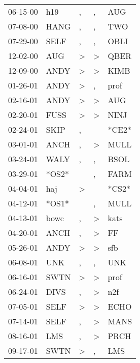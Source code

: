 \begin{supertabular}{lllll}
 06-15-00 &    h19 &             , &                , &    AUG \\
 07-08-00 &   HANG &             , &                , &    TWO \\
 07-29-00 &   SELF &             , &                , &   OBLI \\
 12-02-00 &    AUG &  \textgreater &     \textgreater &   QBER \\
 12-09-00 &   ANDY &  \textgreater &     \textgreater &   KIMB \\
 01-26-01 &   ANDY &  \textgreater &                , &   prof \\
 02-16-01 &   ANDY &  \textgreater &     \textgreater &    AUG \\
 02-20-01 &   FUSS &  \textgreater &     \textgreater &   NINJ \\
 02-24-01 &   SKIP &             , &                  &  *CE2* \\
 03-01-01 &   ANCH &             , &     \textgreater &   MULL \\
 03-24-01 &   WALY &             , &                , &   BSOL \\
 03-29-01 &  *OS2* &               &                , &   FARM \\
 04-04-01 &    haj &  \textgreater &                  &  *CS2* \\
 04-12-01 &  *OS1* &               &                , &   MULL \\
 04-13-01 &   bowc &             , &     \textgreater &   kats \\
 04-20-01 &   ANCH &             , &     \textgreater &     FF \\
 05-26-01 &   ANDY &  \textgreater &     \textgreater &    sfb \\
 06-08-01 &    UNK &             , &                , &    UNK \\
 06-16-01 &   SWTN &  \textgreater &     \textgreater &   prof \\
 06-24-01 &   DIVS &             , &     \textgreater &    n2f \\
 07-05-01 &   SELF &  \textgreater &     \textgreater &   ECHO \\
 07-14-01 &   SELF &             , &     \textgreater &   MANS \\
 08-16-01 &    LMS &             , &     \textgreater &   PRCH \\
 09-17-01 &   SWTN &  \textgreater &                , &    LMS \\

\end{supertabular}

